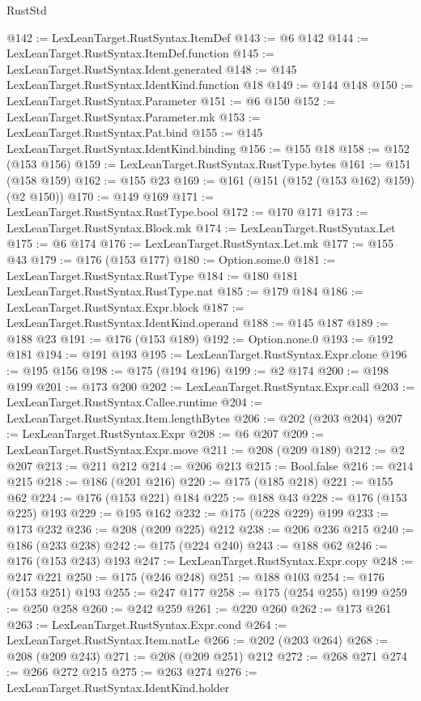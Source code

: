 \begin{lexlean}{RustStd}
\begin{coremodule}
@142 := LexLeanTarget.RustSyntax.ItemDef
@143 := @6 @142
@144 := LexLeanTarget.RustSyntax.ItemDef.function
@145 := LexLeanTarget.RustSyntax.Ident.generated
@148 := @145 LexLeanTarget.RustSyntax.IdentKind.function @18
@149 := @144 @148
@150 := LexLeanTarget.RustSyntax.Parameter
@151 := @6 @150
@152 := LexLeanTarget.RustSyntax.Parameter.mk
@153 := LexLeanTarget.RustSyntax.Pat.bind
@155 := @145 LexLeanTarget.RustSyntax.IdentKind.binding
@156 := @155 @18
@158 := @152 (@153 @156)
@159 := LexLeanTarget.RustSyntax.RustType.bytes
@161 := @151 (@158 @159)
@162 := @155 @23
@169 := @161 (@151 (@152 (@153 @162) @159) (@2 @150))
@170 := @149 @169
@171 := LexLeanTarget.RustSyntax.RustType.bool
@172 := @170 @171
@173 := LexLeanTarget.RustSyntax.Block.mk
@174 := LexLeanTarget.RustSyntax.Let
@175 := @6 @174
@176 := LexLeanTarget.RustSyntax.Let.mk
@177 := @155 @43
@179 := @176 (@153 @177)
@180 := Option.some.{0}
@181 := LexLeanTarget.RustSyntax.RustType
@184 := @180 @181 LexLeanTarget.RustSyntax.RustType.nat
@185 := @179 @184
@186 := LexLeanTarget.RustSyntax.Expr.block
@187 := LexLeanTarget.RustSyntax.IdentKind.operand
@188 := @145 @187
@189 := @188 @23
@191 := @176 (@153 @189)
@192 := Option.none.{0}
@193 := @192 @181
@194 := @191 @193
@195 := LexLeanTarget.RustSyntax.Expr.clone
@196 := @195 @156
@198 := @175 (@194 @196)
@199 := @2 @174
@200 := @198 @199
@201 := @173 @200
@202 := LexLeanTarget.RustSyntax.Expr.call
@203 := LexLeanTarget.RustSyntax.Callee.runtime
@204 := LexLeanTarget.RustSyntax.Item.lengthBytes
@206 := @202 (@203 @204)
@207 := LexLeanTarget.RustSyntax.Expr
@208 := @6 @207
@209 := LexLeanTarget.RustSyntax.Expr.move
@211 := @208 (@209 @189)
@212 := @2 @207
@213 := @211 @212
@214 := @206 @213
@215 := Bool.false
@216 := @214 @215
@218 := @186 (@201 @216)
@220 := @175 (@185 @218)
@221 := @155 @62
@224 := @176 (@153 @221) @184
@225 := @188 @43
@228 := @176 (@153 @225) @193
@229 := @195 @162
@232 := @175 (@228 @229) @199
@233 := @173 @232
@236 := @208 (@209 @225) @212
@238 := @206 @236 @215
@240 := @186 (@233 @238)
@242 := @175 (@224 @240)
@243 := @188 @62
@246 := @176 (@153 @243) @193
@247 := LexLeanTarget.RustSyntax.Expr.copy
@248 := @247 @221
@250 := @175 (@246 @248)
@251 := @188 @103
@254 := @176 (@153 @251) @193
@255 := @247 @177
@258 := @175 (@254 @255) @199
@259 := @250 @258
@260 := @242 @259
@261 := @220 @260
@262 := @173 @261
@263 := LexLeanTarget.RustSyntax.Expr.cond
@264 := LexLeanTarget.RustSyntax.Item.natLe
@266 := @202 (@203 @264)
@268 := @208 (@209 @243)
@271 := @208 (@209 @251) @212
@272 := @268 @271
@274 := @266 @272 @215
@275 := @263 @274
@276 := LexLeanTarget.RustSyntax.IdentKind.holder

\end{coremodule}
\end{lexlean}
